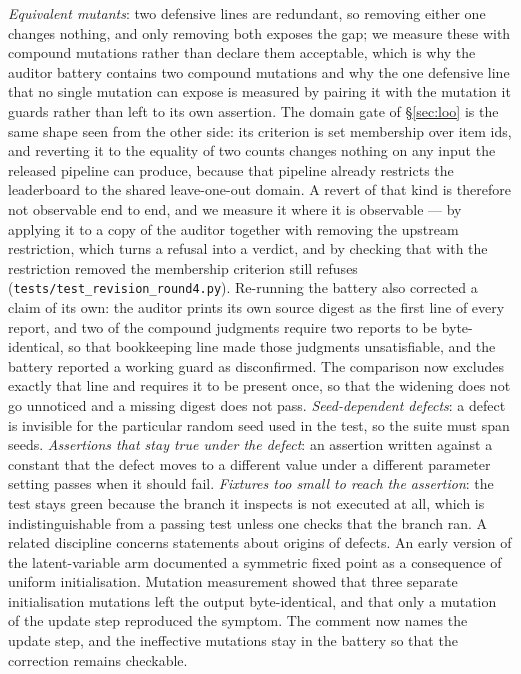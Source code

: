 \documentclass{article}
\newcommand{\ids}[1]{\texttt{\small #1}} %
\begin{document}
\emph{Equivalent mutants}: two defensive lines are redundant, so removing either one changes nothing, and only removing both exposes the gap; we measure these with compound mutations rather than declare them acceptable, which is why the auditor battery contains two compound mutations and why the one defensive line that no single mutation can expose is measured by pairing it with the mutation it guards rather than left to its own assertion. The domain gate of \S\ref{sec:loo} is the same shape seen from the other side: its criterion is set membership over item ids, and reverting it to the equality of two counts changes nothing on any input the released pipeline can produce, because that pipeline already restricts the leaderboard to the shared leave-one-out domain. A revert of that kind is therefore not observable end to end, and we measure it where it is observable --- by applying it to a copy of the auditor together with removing the upstream restriction, which turns a refusal into a verdict, and by checking that with the restriction removed the membership criterion still refuses (\ids{tests/test\_revision\_round4.py}). Re-running the battery also corrected a claim of its own: the auditor prints its own source digest as the first line of every report, and two of the compound judgments require two reports to be byte-identical, so that bookkeeping line made those judgments unsatisfiable, and the battery reported a working guard as disconfirmed. The comparison now excludes exactly that line and requires it to be present once, so that the widening does not go unnoticed and a missing digest does not pass.
\emph{Seed-dependent defects}: a defect is invisible for the particular random seed used in the test, so the suite must span seeds.
\emph{Assertions that stay true under the defect}: an assertion written against a constant that the defect moves to a different value under a different parameter setting passes when it should fail.
\emph{Fixtures too small to reach the assertion}: the test stays green because the branch it inspects is not executed at all, which is indistinguishable from a passing test unless one checks that the branch ran. A related discipline concerns statements about origins of defects. An early version of the latent-variable arm documented a symmetric fixed point as a consequence of uniform initialisation. Mutation measurement showed that three separate initialisation mutations left the output byte-identical, and that only a mutation of the update step reproduced the symptom. The comment now names the update step, and the ineffective mutations stay in the battery so that the correction remains checkable.
\end{document}
